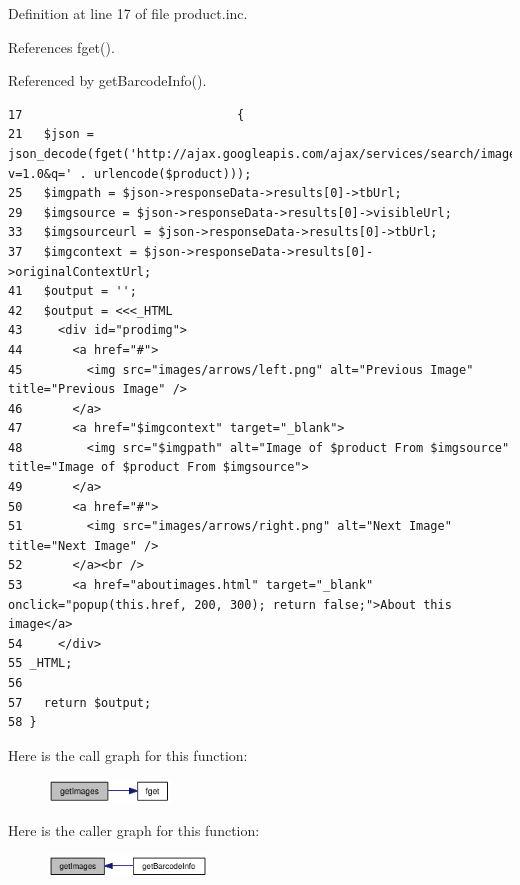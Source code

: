 Definition at line 17 of file product.inc.

References fget().

Referenced by getBarcodeInfo().

\begin{Code}\begin{verbatim}17                              {
21   $json = json_decode(fget('http://ajax.googleapis.com/ajax/services/search/images?v=1.0&q=' . urlencode($product)));
25   $imgpath = $json->responseData->results[0]->tbUrl;
29   $imgsource = $json->responseData->results[0]->visibleUrl;
33   $imgsourceurl = $json->responseData->results[0]->tbUrl;
37   $imgcontext = $json->responseData->results[0]->originalContextUrl;
41   $output = '';
42   $output = <<<_HTML
43     <div id="prodimg">
44       <a href="#">
45         <img src="images/arrows/left.png" alt="Previous Image" title="Previous Image" />
46       </a>
47       <a href="$imgcontext" target="_blank">
48         <img src="$imgpath" alt="Image of $product From $imgsource" title="Image of $product From $imgsource">
49       </a>
50       <a href="#">
51         <img src="images/arrows/right.png" alt="Next Image" title="Next Image" />
52       </a><br />
53       <a href="aboutimages.html" target="_blank" onclick="popup(this.href, 200, 300); return false;">About this image</a>
54     </div>
55 _HTML;
56 
57   return $output;
58 }
\end{verbatim}
\end{Code}




Here is the call graph for this function:\nopagebreak
\begin{figure}[H]
\begin{center}
\leavevmode
\includegraphics[width=92pt]{product_8inc_9dbb778854cfe105058d7161ca8f058c_cgraph}
\end{center}
\end{figure}


Here is the caller graph for this function:\nopagebreak
\begin{figure}[H]
\begin{center}
\leavevmode
\includegraphics[width=120pt]{product_8inc_9dbb778854cfe105058d7161ca8f058c_icgraph}
\end{center}
\end{figure}
